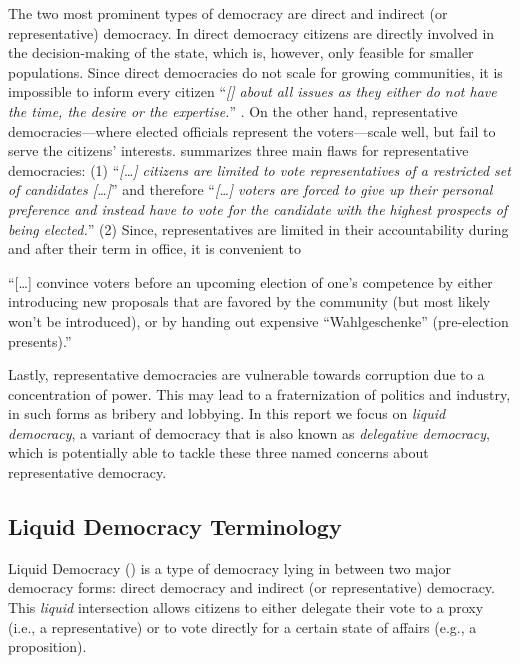 The two most prominent types of democracy are direct and indirect (or representative) democracy. In direct democracy citizens are directly involved in the decision-making of the state, which is, however, only feasible for smaller populations. Since direct democracies do not scale for growing communities, it is impossible to inform every citizen “\textit{[\textellipsis{}] about all issues as they either do not have the time, the desire or the expertise.}” \parencite{Schiener2015}. On the other hand, representative democracies---where elected officials represent the voters---scale well, but fail to serve the citizens’ interests. \citeauthor{Schiener2015} summarizes three main flaws for representative democracies: (1) “\textit{[\ldots] citizens are limited to vote representatives of a restricted set of candidates [\ldots]}” and therefore “\textit{[\ldots] voters are forced to give up their personal preference and instead have to vote for the candidate with the highest prospects of being elected.}” (2) Since, representatives are limited in their accountability during and after their term in office, it is convenient to

\begin{displayquote}
“[\ldots] convince voters before an upcoming election of one’s competence by either introducing new proposals that are favored by the community (but most likely won’t be introduced), or by handing out expensive “Wahlgeschenke” (pre-election presents).”\\[1mm]
\hspace*{\fill}\textcite{Schiener2015}
\end{displayquote}

Lastly, representative democracies are vulnerable towards corruption due to a concentration of power. This may lead to a fraternization of politics and industry, in such forms as bribery and lobbying. In this report we focus on \textit{liquid democracy}, a variant of democracy that is also known as \textit{delegative democracy}, which is potentially able to tackle these three named concerns about representative democracy.


\subsection{Liquid Democracy Terminology}
\label{ssec:Liquid_Democracy}

Liquid Democracy () is a type of democracy lying in between two major democracy forms: direct democracy and indirect (or representative) democracy. This \textit{liquid} intersection allows citizens to either delegate their vote to a proxy (i.e., a representative) or to vote directly for a certain state of affairs (e.g., a proposition).

